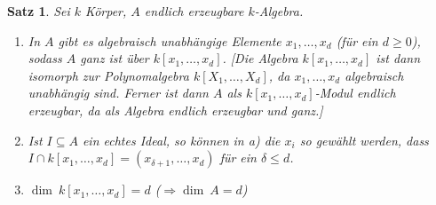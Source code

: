 \documentclass[a4paper,12pt]{scrbook}
\theoremstyle{break}
\newtheorem{Satz}{Satz}
\theoremstyle{nonumberbreak}
\theoremstyle{nonumberplain}
\begin{document}
\begin{Satz}
\label{11}
Sei $k$ Körper, $A$ endlich erzeugbare $k$-Algebra.
\begin{enumerate}
\item In $A$ gibt es algebraisch unabhängige Elemente $x_1, \ldots, x_d$ (für ein
$d \geq 0$), sodass $A$ ganz ist über $k[x_1, \ldots, x_d]$. [Die Algebra $k[x_1, \ldots , x_d]$
ist dann isomorph zur Polynomalgebra $k[X_1,\ldots,X_d]$, da $x_1, \ldots , x_d$ algebraisch
unabhängig sind. Ferner ist dann $A$ als $k[x_1, \ldots, x_d]$-Modul endlich erzeugbar,
da als Algebra endlich erzeugbar und ganz.]
\item Ist $I\subseteq A$ ein echtes Ideal, so können in a) die $x_i$ so
gewählt werden, dass $I\cap k[x_1, \ldots, x_d]=(x_{\delta+1},\ldots,x_d)$ für ein
$\delta \leq d$.
\item $\dim\ k[x_1, \ldots, x_d]=d$ ($\Rightarrow \dim\ A = d$)
\end{enumerate}
\end{Satz}
\end{document}
